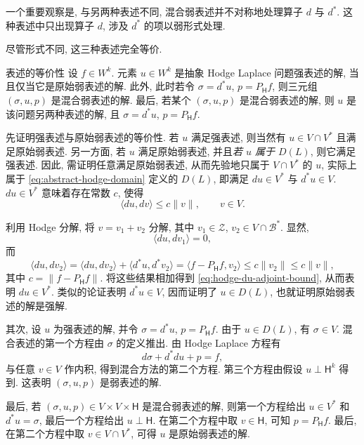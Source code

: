 {一个重要观察是, 与另两种表述不同, 混合弱表述并不对称地处理算子 $d$ 与 $d^*$. 这种表述中只出现算子 $d$, 涉及 $d^*$ 的项以弱形式处理.}

{尽管形式不同, 这三种表述完全等价.}

\begin{Theorem}{{表述的等价性}}\label{thm:hodge-formulation-equivalence}
{设 $f\in W^k$. 元素 $u\in W^k$ 是抽象 Hodge Laplace 问题强表述的解, 当且仅当它是原始弱表述的解. 此外, 此时若令 $\sigma=d^*u$, $p=P_{\mathsf H}f$, 则三元组 $(\sigma,u,p)$ 是混合弱表述的解. 最后, 若某个 $(\sigma,u,p)$ 是混合弱表述的解, 则 $u$ 是该问题另两种表述的解, 且 $\sigma=d^*u$, $p=P_{\mathsf H}f$.}
\end{Theorem}

\begin{Proof}
{先证明强表述与原始弱表述的等价性. 若 $u$ 满足强表述, 则当然有 $u\in V\cap V^*$ 且满足原始弱表述. 另一方面, 若 $u$ 满足原始弱表述, 并且\emph{若 $u$ 属于 $D(L)$}, 则它满足强表述. 因此, 需证明任意满足原始弱表述, 从而先验地只属于 $V\cap V^*$ 的 $u$, 实际上属于 \eqref{eq:abstract-hodge-domain} 定义的 $D(L)$, 即满足 $du\in V^*$ 与 $d^*u\in V$. $du\in V^*$ 意味着存在常数 $c$, 使得}
\begin{equation}\label{eq:hodge-du-adjoint-bound}
\langle du,dv\rangle\leq c\|v\|,\qquad v\in V.
\end{equation}

{利用 Hodge 分解, 将 $v=v_1+v_2$ 分解, 其中 $v_1\in\mathcal Z$, $v_2\in V\cap\mathcal B^*$. 显然,}
\[
\langle du,dv_1\rangle=0,
\]
{而}
\[
\langle du,dv_2\rangle=\langle du,dv_2\rangle+\langle d^*u,d^*v_2\rangle=\langle f-P_{\mathsf H}f,v_2\rangle\leq c\|v_2\|\leq c\|v\|,
\]
{其中 $c=\|f-P_{\mathsf H}f\|$. 将这些结果相加得到 \eqref{eq:hodge-du-adjoint-bound}, 从而表明 $du\in V^*$. 类似的论证表明 $d^*u\in V$, 因而证明了 $u\in D(L)$, 也就证明原始弱表述的解是强解.}

{其次, 设 $u$ 为强表述的解, 并令 $\sigma=d^*u$, $p=P_{\mathsf H}f$. 由于 $u\in D(L)$, 有 $\sigma\in V$. 混合表述的第一个方程由 $\sigma$ 的定义推出. 由 Hodge Laplace 方程有}
\[
d\sigma+d^*du+p=f,
\]
{与任意 $v\in V$ 作内积, 得到混合方法的第二个方程. 第三个方程由假设 $u\perp\mathsf H^k$ 得到. 这表明 $(\sigma,u,p)$ 是弱表述的解.}

{最后, 若 $(\sigma,u,p)\in V\times V\times\mathsf H$ 是混合弱表述的解, 则第一个方程给出 $u\in V^*$ 和 $d^*u=\sigma$, 最后一个方程给出 $u\perp\mathsf H$. 在第二个方程中取 $v\in\mathsf H$, 可知 $p=P_{\mathsf H}f$. 最后, 在第二个方程中取 $v\in V\cap V^*$, 可得 $u$ 是原始弱表述的解.}
\end{Proof}

